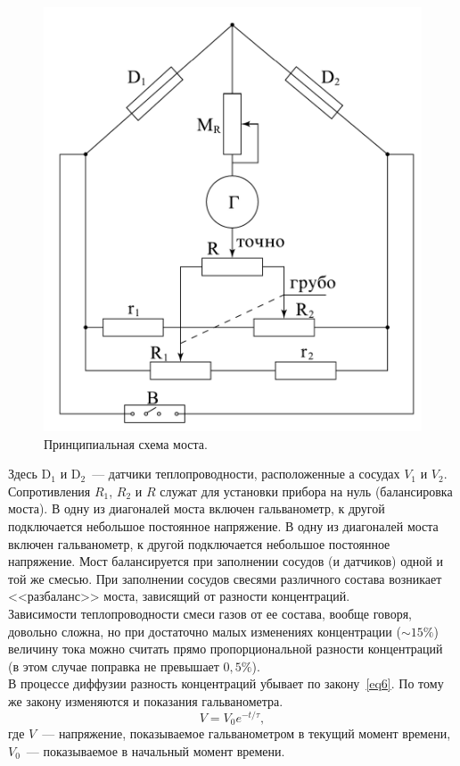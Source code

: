 \documentclass[a4paper,11pt]{article}
\begin{document}
\begin{figure}\label{fig:img2}
  \centering
  \includegraphics[scale = 0.2]{scheme2.png}
  \caption{Принципиальная схема моста.}
\end{figure}
Здесь D$_{1}$ и D$_{2}$~--- датчики теплопроводности, расположенные а сосудах $V_{1}$ и $V_{2}$. Сопротивления $R_{1}$, $R_{2}$ и $R$ служат для установки прибора на нуль (балансировка моста). В одну из диагоналей моста включен гальванометр, к другой подключается небольшое постоянное напряжение. В одну из диагоналей моста включен гальванометр, к другой подключается небольшое постоянное напряжение. Мост балансируется при заполнении сосудов (и датчиков) одной и той же смесью. При заполнении сосудов свесями различного состава возникает <<разбаланс>> моста, зависящий от разности концентраций.\\
Зависимости теплопроводности смеси газов от ее состава, вообще говоря, довольно сложна, но при достаточно малых изменениях концентрации ($\sim 15\%$) величину тока можно считать прямо пропорциональной разности концентраций (в этом случае поправка не превышает $0,5\%$).\\
В процессе диффузии разность концентраций убывает по закону~\ref{eq6}. По тому же закону изменяются и показания гальванометра.
\begin{equation}
  V = V_{0} e^{-t/\tau},
\end{equation}
где $V$~--- напряжение, показываемое гальванометром в текущий момент времени, $V_{0}$~--- показываемое в начальный момент времени.
\end{document}

